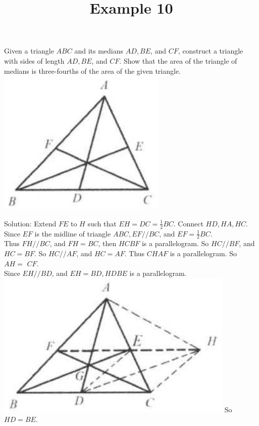 \documentclass{article}
\title{Example 10}
\date{}
\begin{document}
\maketitle

Given a triangle \(A B C\) and its medians \(A D, B E\), and \(C F\), construct a triangle with sides of length \(A D, B E\), and \(C F\). Show that the area of the triangle of medians is three-fourths of the area of the given triangle.\\
\centering
\includegraphics[width=\textwidth]{images/problem_image_1.jpg}


Solution:
Extend \(F E\) to \(H\) such that \(E H=D C=\frac{1}{2} B C\). Connect \(H D, H A, H C\).\\
Since \(E F\) is the midline of triangle \(A B C, E F / / B C\), and \(E F=\frac{1}{2} B C\).\\
Thus \(F H / / B C\), and \(F H=B C\), then \(H C B F\) is a parallelogram. So \(H C / / B F\), and \(H C=B F\). So \(H C / / A F\), and \(H C=A F\). Thus \(C H A F\) is a parallelogram. So \(A H=\) \(C F\).\\
Since \(E H / / B D\), and \(E H=B D, H D B E\) is a parallelogram.\\
\includegraphics[width=\textwidth]{images/reasoning_image_1.jpg} So \(H D=B E\).
\end{document}
